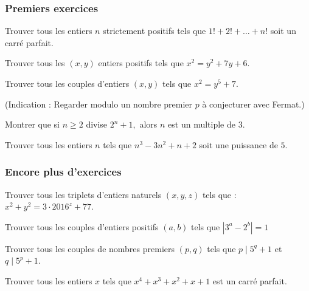 \author{Matthieu Bouyer, Auguste de Lambilly}

\subsubsection{Premiers exercices}

\begin{exo}
Trouver tous les entiers $n$ strictement positifs tels que $1!+2!+\ldots+n!$ soit un carré parfait.
\end{exo}

\begin{exo}
Trouver tous les $(x,y)$ entiers positifs tels que $x^2=y^2+7y+6$.
\end{exo}

\begin{exo}
Trouver tous les couples d'entiers $(x,y)$ tels que $x^2=y^5+7$.

(Indication : Regarder modulo un nombre premier $p$ à conjecturer avec Fermat.)
\end{exo}

\begin{exo}
Montrer que si $n\ge2$ divise $2^n+1,$ alors $n$ est un multiple de $3$.
\end{exo}

\begin{exo}
Trouver tous les entiers $n$ tels que $n^3-3n^2+n+2$ soit une puissance de $5$.
\end{exo}

\subsubsection{Encore plus d'exercices}


\begin{exo}
Trouver tous les triplets d’entiers naturels $(x,y,z)$ tels que :
$x^2+y^2=3\cdot2016^z+77$.
\end{exo}

\begin{exo}
Trouver tous les couples d'entiers positifs $(a,b)$ tels que $|3^a-2^b|=1$
\end{exo}


\begin{exo}
Trouver tous les couples de nombres premiers $(p,q)$ tels que $p\mid5^q+1$ et $q\mid5^p+1$.
\end{exo}


\begin{exo}
Trouver tous les entiers $x$ tels que $x^4+x^3+x^2+x+1$ est un carré parfait.
\end{exo}


